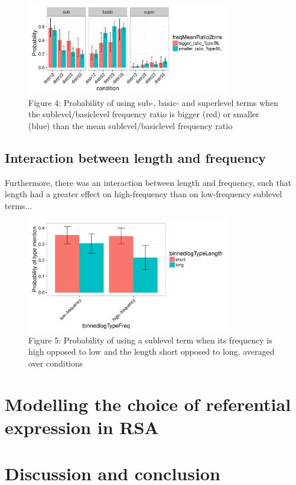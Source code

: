 \documentclass[10pt,letterpaper]{article}
\begin{document}
\begin{figure}[ht!]
\centering
\includegraphics[width=90mm]{graphs/frequencyRatio.pdf}
\caption{Figure 4: Probability of using sub-, basic- and superlevel terms when the sublevel/basiclevel frequency ratio is bigger (red) or smaller (blue) than the mean  sublevel/basiclevel frequency ratio \label{overflow}}
\end{figure}

\subsection{\bf Interaction between length and frequency}
Furthermore, there was an interaction between length and frequency, such that length had a greater effect on high-frequency than on low-frequency sublevel terms...

\begin{figure}[ht!]
\centering
\includegraphics[width=90mm]{graphs/freq-length-interaction-noconds.pdf}
\caption{Figure 5: Probability of using a sublevel term when its frequency is high opposed to low and the length short opposed to long, averaged over conditions \label{overflow}}
\end{figure}

\section{\bf Modelling the choice of referential expression in RSA}

\section{\bf Discussion and conclusion}
\end{document}
